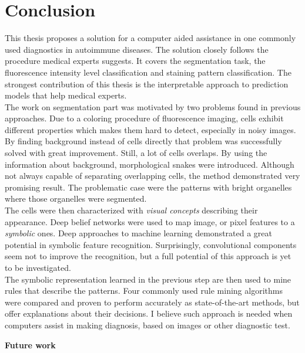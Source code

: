 \chapter{Conclusion}

\label{Conclusion}

This thesis proposes a solution for a computer aided assistance in one commonly used diagnostics in autoimmune diseases. The solution closely follows the procedure medical experts suggests. It covers the segmentation task,  the fluorescence intensity level classification and staining pattern classification. The strongest contribution of this thesis is the interpretable approach to prediction models that help medical experts. \\

The work on segmentation part was motivated by two problems found in previous approaches. Due to a coloring procedure of fluorescence imaging, cells exhibit different properties which makes them hard to detect, especially in noisy images. By finding background instead of cells directly that problem was successfully solved with great improvement. Still, a lot of cells overlaps.  By using the information about background, morphological snakes were introduced. Although not always capable of separating overlapping cells, the method demonstrated very promising result. The problematic case were the patterns with bright organelles where those organelles were segmented. \\

The cells were then characterized with \textit{visual concepts} describing their appearance. Deep belief networks were used to map image, or pixel features to a \textit{symbolic} ones. Deep approaches to machine learning demonstrated a great potential in symbolic feature recognition. Surprisingly, convolutional components seem not to improve the recognition, but a full potential of this approach is yet to be investigated. \\

The symbolic representation learned in the previous step are then used to mine rules that describe the patterns. Four commonly used rule mining algorithms were compared and proven to perform accurately as state-of-the-art methods, but offer explanations about their decisions. I believe such approach is needed when computers assist in making diagnosis, based on images or other diagnostic test.

\begin{flushleft}
	\large
	\vspace{15pt}
	\textbf{Future work}
\end{flushleft}

